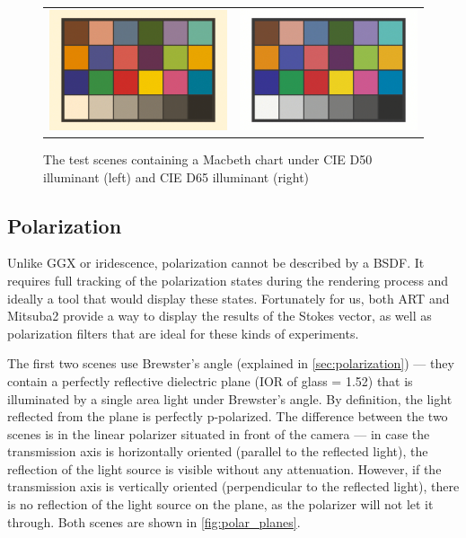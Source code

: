 \begin{figure}[h]
	\begin{tabular}{cc}
		\includegraphics[width=.45\linewidth]{img/macbeth_chart_D50.png}
		&
		\includegraphics[width=.45\linewidth]{img/macbeth_chart_D65.png}
	\end{tabular}
	\caption{The test scenes containing a Macbeth chart under CIE D50 illuminant (left) and CIE D65 illuminant (right)}
	\label{fig:macbeth}
\end{figure}

\subsection{Polarization}

Unlike GGX or iridescence, polarization cannot be described by a BSDF. It requires full tracking of the polarization states during the rendering process and ideally a tool that would display these states. Fortunately for us, both ART and Mitsuba2 provide a way to display the results of the Stokes vector, as well as polarization filters that are ideal for these kinds of experiments.

The first two scenes use Brewster's angle (explained in \autoref{sec:polarization}) --- they contain a perfectly reflective dielectric plane (IOR of glass = 1.52) that is illuminated by a single area light under Brewster's angle. By definition, the light reflected from the plane is perfectly p-polarized. The difference between the two scenes is in the linear polarizer situated in front of the camera --- in case the transmission axis is horizontally oriented (parallel to the reflected light), the reflection of the light source is visible without any attenuation. However, if the transmission axis is vertically oriented (perpendicular to the reflected light), there is no reflection of the light source on the plane, as the polarizer will not let it through. Both scenes are shown in \autoref{fig:polar_planes}.

